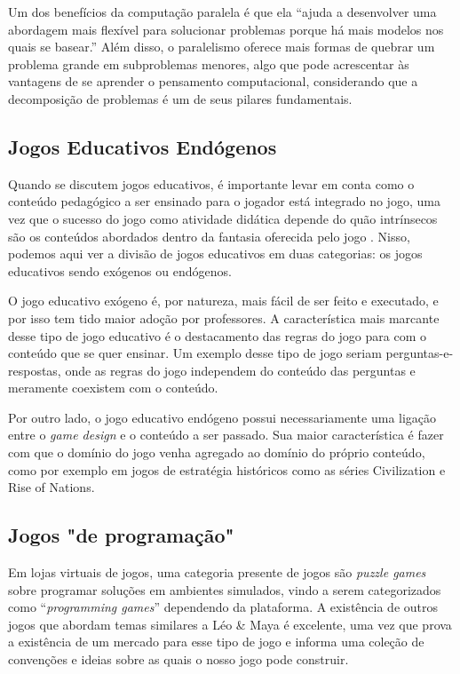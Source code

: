 \documentclass[conference]{IEEEtran}
\begin{document}
Um dos benefícios da computação paralela é que ela ``ajuda a desenvolver uma abordagem mais flexível para solucionar problemas porque há mais modelos nos quais se basear.''\cite{b5} Além disso, o paralelismo oferece mais formas de quebrar um problema grande em subproblemas menores, algo que pode acrescentar às vantagens de se aprender o pensamento computacional, considerando que a decomposição de problemas é um de seus pilares fundamentais\cite{b5}.

\subsection{Jogos Educativos Endógenos}

Quando se discutem jogos educativos, é importante levar em conta como o conteúdo pedagógico a ser ensinado para o jogador está integrado no jogo, uma vez que o sucesso do jogo como atividade didática depende do quão intrínsecos são os conteúdos abordados dentro da fantasia oferecida pelo jogo \cite{b13}. Nisso, podemos aqui ver a divisão de jogos educativos em duas categorias: os jogos educativos sendo exógenos ou endógenos\cite{b14}.

O jogo educativo exógeno é, por natureza, mais fácil de ser feito e executado, e por isso tem tido maior adoção por professores.\cite{b14} A característica mais marcante desse tipo de jogo educativo é o destacamento das regras do jogo para com o conteúdo que se quer ensinar.  Um exemplo desse tipo de jogo seriam perguntas-e-respostas, onde as regras do jogo independem do conteúdo das perguntas e meramente coexistem com o conteúdo.

Por outro lado, o jogo educativo endógeno possui necessariamente uma ligação entre o \textit{game design} e o conteúdo a ser passado. Sua maior característica é fazer com que o domínio do jogo venha agregado ao domínio do próprio conteúdo, como por exemplo em jogos de estratégia históricos como as séries Civilization e Rise of Nations\cite{b14}.

\subsection{Jogos "de programação"}

Em lojas virtuais de jogos, uma categoria presente de jogos são \textit{puzzle games} sobre programar soluções em ambientes simulados\cite{b15}\cite{b16}, vindo a serem categorizados como ``\textit{programming games}'' dependendo da plataforma\cite{b17}. A existência de outros jogos que abordam temas similares a Léo \& Maya é excelente, uma vez que prova a existência de um mercado para esse tipo de jogo e informa uma coleção de convenções e ideias sobre as quais o nosso jogo pode construir.
\end{document}
